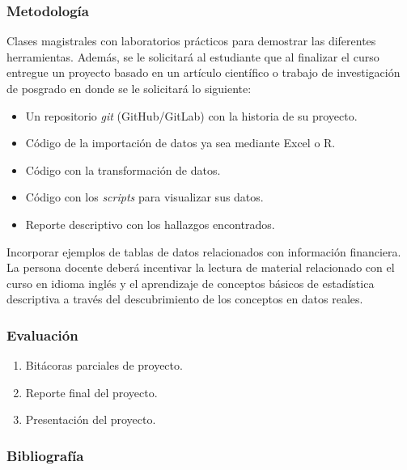 \begin{refsection}
\subsubsection*{Metodología}

Clases magistrales con laboratorios prácticos para demostrar las diferentes herramientas. Además, se le solicitará al estudiante que al finalizar el curso entregue un proyecto basado en un artículo científico o trabajo de investigación de posgrado en donde se le solicitará lo siguiente:

\begin{itemize}
\item Un repositorio \emph{git} (GitHub/GitLab) con la historia de su proyecto.
\item Código de la importación de datos ya sea mediante Excel o R.
\item Código con la transformación de datos.
\item Código con los \emph{scripts} para visualizar sus datos.
\item Reporte descriptivo con los hallazgos encontrados.
\end{itemize}

Incorporar ejemplos de tablas de datos relacionados con información financiera. La persona docente deberá incentivar la lectura de material relacionado con el curso en idioma inglés y el aprendizaje de conceptos básicos de estadística descriptiva a través del descubrimiento de los conceptos en datos reales.

\subsubsection*{Evaluación}

\begin{enumerate}
\item Bitácoras parciales de proyecto.
\item Reporte final del proyecto.
\item Presentación del proyecto.
\end{enumerate}

\subsubsection*{Bibliografía}


\end{refsection}
